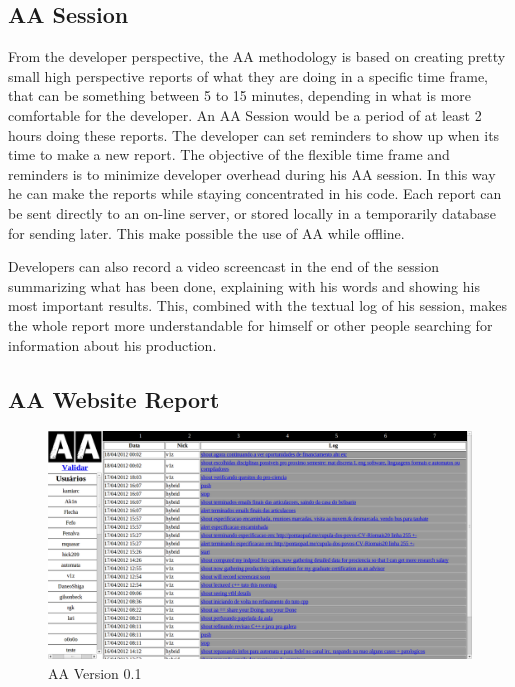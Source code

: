\documentclass[letterpaper]{article}
\begin{document}
\subsection{AA Session}

From the developer perspective, the AA methodology is based on
creating pretty small high perspective reports of what they are doing
in a specific time frame, that can be something between 5 to 15
minutes, depending in what is more comfortable for the developer. An
AA Session would be a period of at least 2 hours doing these
reports. The developer can set reminders to show up when its time to
make a new report. The objective of the flexible time frame and
reminders is to minimize developer overhead during his AA session. In
this way he can make the reports while staying concentrated in his
code. Each report can be sent directly to an on-line server, or stored
locally in a temporarily database for sending later. This make
possible the use of AA while offline.

Developers can also record a video screencast in the end of the
session summarizing what has been done, explaining with his words and
showing his most important results. This, combined with the textual
log of his session, makes the whole report more understandable for
himself or other people searching for information about his
production.

\subsection{AA Website Report}

\begin{figure}
\begin{center}
   \includegraphics[width=0.95\linewidth]{figs/aa-0_1.png}
\end{center}
   \caption{AA Version 0.1}
\label{fig:aaserver}
\end{figure}
\end{document}
